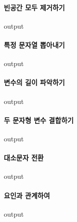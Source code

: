 \documentclass{report}
\begin{document}
\paragraph{빈공간 모두 제거하기}
\begin{Schunk}
\begin{Soutput}
output
\end{Soutput}
\end{Schunk}

\paragraph{특정 문자열 뽑아내기}
\begin{Schunk}
\begin{Soutput}
output
\end{Soutput}
\end{Schunk}

\paragraph{변수의 길이 파악하기}
\begin{Schunk}
\begin{Soutput}
output
\end{Soutput}
\end{Schunk}

\paragraph{두 문자형 변수 결합하기}
\begin{Schunk}
\begin{Soutput}
output
\end{Soutput}
\end{Schunk}

\paragraph{대소문자 전환} 
\begin{Schunk}
\begin{Soutput}
output
\end{Soutput}
\end{Schunk}

\paragraph{요인과 관계하여}
\begin{Schunk}
\begin{Soutput}
output
\end{Soutput}
\end{Schunk}
\end{document}
